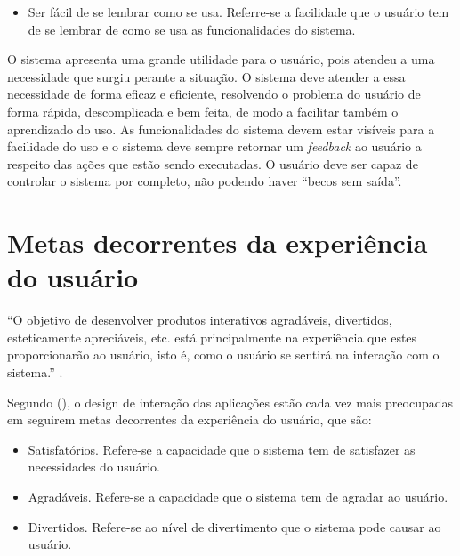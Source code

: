     \begin{itemize}
       \item Ser fácil de se lembrar como se usa.
       \subitem Referre-se a facilidade que o usuário tem de se lembrar de como se usa as funcionalidades do sistema.
    \end{itemize}
  
    O sistema apresenta uma grande utilidade para o usuário, pois atendeu a uma necessidade que surgiu perante a situação. 
    O sistema deve atender a essa necessidade de forma eficaz e eficiente, resolvendo o problema do usuário de forma rápida,
    descomplicada e bem feita, de modo a facilitar também o aprendizado do uso. As funcionalidades do sistema devem estar visíveis 
    para a facilidade do uso e o sistema deve sempre retornar um \textit{feedback} ao usuário a respeito das ações que estão
    sendo executadas. O usuário deve ser capaz de controlar o sistema por completo, não podendo haver “becos sem saída”.

  \section{Metas decorrentes da experiência do usuário}
    
    “O objetivo de desenvolver produtos interativos agradáveis, divertidos, esteticamente apreciáveis, etc. 
    está principalmente na experiência que estes proporcionarão ao usuário, isto é, como o usuário se 
    sentirá na interação com o sistema.” \cite{preece}.
    
    Segundo \citeauthor{preece} (\citeyear{preece}), o design de interação das aplicações estão cada vez mais preocupadas em seguirem 
    metas decorrentes da experiência do usuário, que são:
    
    \begin{itemize}
       \item Satisfatórios.
       \subitem Refere-se a capacidade que o sistema tem de satisfazer as necessidades do usuário.
    \end{itemize}
    
    \begin{itemize}
       \item Agradáveis.
       \subitem Refere-se a capacidade que o sistema tem de agradar ao usuário.
    \end{itemize}
    
    \begin{itemize}
       \item Divertidos.
       \subitem Refere-se ao nível de divertimento que o sistema pode causar ao usuário.
    \end{itemize}
    
